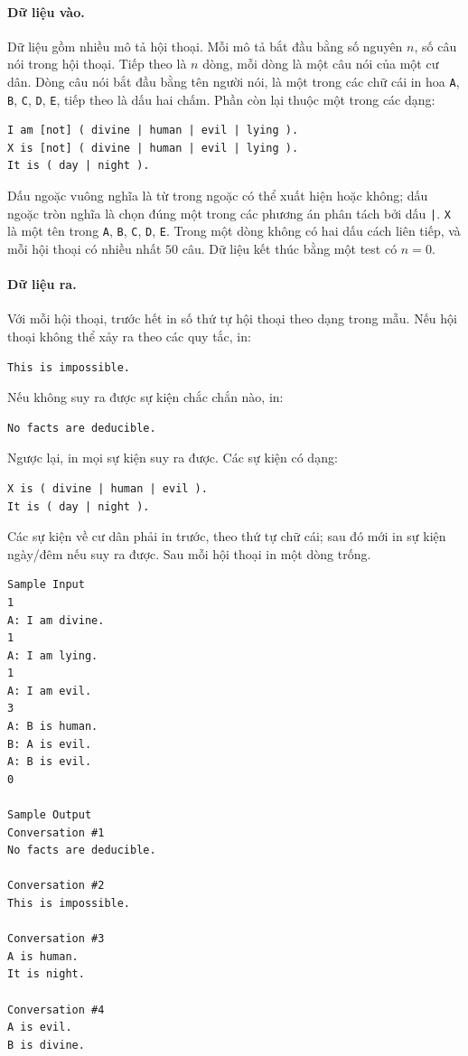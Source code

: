 \documentclass[11pt]{article}
\begin{document}
\paragraph{Dữ liệu vào.}
Dữ liệu gồm nhiều mô tả hội thoại. Mỗi mô tả bắt đầu bằng số nguyên \(n\), số
câu nói trong hội thoại. Tiếp theo là \(n\) dòng, mỗi dòng là một câu nói của
một cư dân. Dòng câu nói bắt đầu bằng tên người nói, là một trong các chữ cái
in hoa \texttt{A}, \texttt{B}, \texttt{C}, \texttt{D}, \texttt{E}, tiếp theo là
dấu hai chấm. Phần còn lại thuộc một trong các dạng:
\begin{verbatim}
I am [not] ( divine | human | evil | lying ).
X is [not] ( divine | human | evil | lying ).
It is ( day | night ).
\end{verbatim}
Dấu ngoặc vuông nghĩa là từ trong ngoặc có thể xuất hiện hoặc không; dấu ngoặc
tròn nghĩa là chọn đúng một trong các phương án phân tách bởi dấu \texttt{|}.
\texttt{X} là một tên trong \texttt{A}, \texttt{B}, \texttt{C}, \texttt{D},
\texttt{E}. Trong một dòng không có hai dấu cách liên tiếp, và mỗi hội thoại có
nhiều nhất \(50\) câu. Dữ liệu kết thúc bằng một test có \(n=0\).

\paragraph{Dữ liệu ra.}
Với mỗi hội thoại, trước hết in số thứ tự hội thoại theo dạng trong mẫu. Nếu
hội thoại không thể xảy ra theo các quy tắc, in:
\begin{verbatim}
This is impossible.
\end{verbatim}
Nếu không suy ra được sự kiện chắc chắn nào, in:
\begin{verbatim}
No facts are deducible.
\end{verbatim}
Ngược lại, in mọi sự kiện suy ra được. Các sự kiện có dạng:
\begin{verbatim}
X is ( divine | human | evil ).
It is ( day | night ).
\end{verbatim}
Các sự kiện về cư dân phải in trước, theo thứ tự chữ cái; sau đó mới in sự
kiện ngày/đêm nếu suy ra được. Sau mỗi hội thoại in một dòng trống.

\begin{verbatim}
Sample Input
1
A: I am divine.
1
A: I am lying.
1
A: I am evil.
3
A: B is human.
B: A is evil.
A: B is evil.
0

Sample Output
Conversation #1
No facts are deducible.

Conversation #2
This is impossible.

Conversation #3
A is human.
It is night.

Conversation #4
A is evil.
B is divine.
\end{verbatim}
\end{document}
